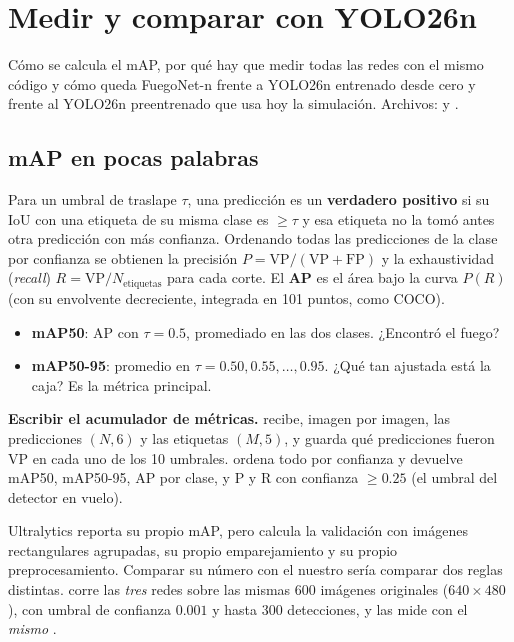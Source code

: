 \chapter{Medir y comparar con YOLO26n}
\label{cap:evaluar}

\begin{enpocas}
Cómo se calcula el mAP, por qué hay que medir todas las redes con el mismo
código y cómo queda FuegoNet-n frente a YOLO26n entrenado desde cero y frente al
YOLO26n preentrenado que usa hoy la simulación. Archivos:
 y .
\end{enpocas}

\section{mAP en pocas palabras}

Para un umbral de traslape $\tau$, una predicción es un \textbf{verdadero
positivo} si su IoU con una etiqueta de su misma clase es $\ge\tau$ y esa
etiqueta no la tomó antes otra predicción con más confianza. Ordenando todas las
predicciones de la clase por confianza se obtienen la precisión
$P = \text{VP}/(\text{VP}+\text{FP})$ y la exhaustividad (\emph{recall})
$R = \text{VP}/N_{\text{etiquetas}}$ para cada corte. El \textbf{AP} es el área
bajo la curva $P(R)$ (con su envolvente decreciente, integrada en 101 puntos,
como COCO).
\begin{itemize}
  \item \textbf{mAP50}: AP con $\tau = 0.5$, promediado en las dos clases. ¿Encontró el fuego?
  \item \textbf{mAP50-95}: promedio en $\tau = 0.50, 0.55,\dots,0.95$. ¿Qué tan
        ajustada está la caja? Es la métrica principal.
\end{itemize}

 \textbf{Escribir el acumulador de métricas.}
 recibe, imagen por imagen, las predicciones
$(N,6)$ y las etiquetas $(M,5)$, y guarda qué predicciones fueron VP en cada uno de
los 10 umbrales.  ordena todo por confianza y devuelve mAP50,
mAP50-95, AP por clase, y P y R con confianza $\ge 0.25$ (el umbral del
detector en vuelo).

\begin{aviso}
Ultralytics reporta su propio mAP, pero calcula la validación con imágenes
rectangulares agrupadas, su propio emparejamiento y su propio preprocesamiento.
Comparar su número con el nuestro sería comparar dos reglas distintas.
 corre las \emph{tres} redes sobre las mismas 600 imágenes
originales ($640\times480$), con umbral de confianza $0.001$ y hasta 300
detecciones, y las mide con el \emph{mismo} .
\end{aviso}

